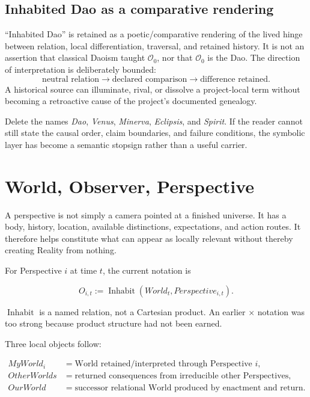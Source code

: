 \documentclass[11pt]{article}
\begin{document}
\subsection{Inhabited Dao as a comparative rendering}
``Inhabited Dao'' is retained as a poetic/comparative rendering of the lived
hinge between relation, local differentiation, traversal, and retained history.
It is not an assertion that classical Daoism taught $\mathcal O_0$, nor that
$\mathcal O_0$ is the Dao.  The direction of interpretation is deliberately
bounded:
\begin{equation}
\text{neutral relation}\to\text{declared comparison}\to\text{difference retained}.
\end{equation}
A historical source can illuminate, rival, or dissolve a project-local term
without becoming a retroactive cause of the project's documented genealogy.

\begin{devilaudit}
Delete the names \emph{Dao}, \emph{Venus}, \emph{Minerva}, \emph{Eclipsis},
and \emph{Spirit}.  If the reader cannot still state the causal order, claim
boundaries, and failure conditions, the symbolic layer has become a semantic
stopsign rather than a useful carrier.
\end{devilaudit}

\section{World, Observer, Perspective}

A perspective is not simply a camera pointed at a finished universe. It has a body, history, location, available distinctions, expectations, and action routes. It therefore helps constitute what can appear as locally relevant without thereby creating Reality from nothing.

For Perspective $i$ at time $t$, the current notation is

\begin{equation}
O_{i,t}:=\operatorname{Inhabit}(World_t,Perspective_{i,t}).
\end{equation}

$\operatorname{Inhabit}$ is a named relation, not a Cartesian product. An earlier $\times$ notation was too strong because product structure had not been earned.

Three local objects follow:

\begin{align}
MyWorld_i &= \text{World retained/interpreted through Perspective }i,\\
OtherWorlds &= \text{returned consequences from irreducible other Perspectives},\\
OurWorld &= \text{successor relational World produced by enactment and return}.
\end{align}
\end{document}
